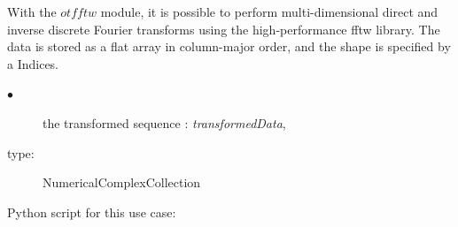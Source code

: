 With the $otfftw$ module, it is possible to perform multi-dimensional direct and inverse discrete Fourier transforms using the high-performance fftw library. The data is stored as a flat array in column-major order, and the shape is specified by a Indices.

{
  \begin{description}
  \item[$\bullet$] the transformed sequence : {\itshape transformedData},
  \item[type:] NumericalComplexCollection
  \end{description}
}
\espace

Python script for this use case:



